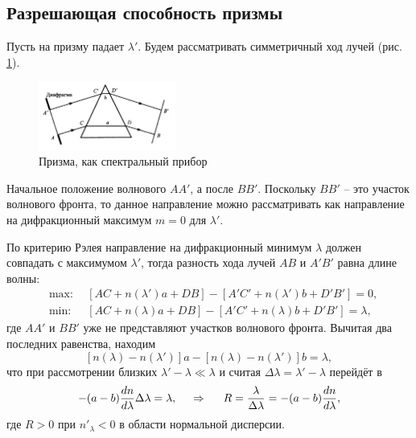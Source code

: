 \subsection{Разрешающая способность призмы}

Пусть на призму падает $\lambda'$. Будем рассматривать симметричный ход лучей (рис. \ref{fig:pr}). 
\begin{figure}[h]
    \centering
    \includegraphics[width=0.4\textwidth]{figures/49_1.png}
    \caption{Призма, как спектральный прибор}
    \label{fig:pr}
\end{figure}
Начальное положение волнового $AA'$, а после $BB'$. Поскольку $BB'$ -- это участок волнового фронта, то данное направление можно рассматривать как направление на дифракционный максимум $m=0$ для $\lambda'$. 

По критерию Рэлея направление на дифракционный минимум $\lambda$ должен совпадать с максимумом $\lambda'$, тогда разность хода лучей $AB$ и $A' B'$ равна длине волны:
\begin{align*}
    &\text{max:} \ \ 
    &\left[AC + n(\lambda') a + DB\right] - \left[
        A'C' + n(\lambda') b + D' B'
    \right] = 0, \\
    &\text{min:} \ \ 
    &\left[AC + n(\lambda) a + DB\right] - 
    \left[
        A'C' + n(\lambda) b + D' B'
    \right] = \lambda,
\end{align*}
где $AA'$ и $BB'$ уже не представляют участков волнового фронта.  Вычитая два последних равенства, находим
\begin{equation*}
    \left[n(\lambda)-n(\lambda')\right]a - \left[n(\lambda)-n(\lambda')\right]b = \lambda,
\end{equation*}
что при рассмотрении близких $\lambda' - \lambda \ll\lambda$ и считая $\Delta \lambda = \lambda'-\lambda$ перейдёт в 
\begin{equation*}
    -(a-b) \frac{d n}{d \lambda} \Delta \lambda = \lambda,
    \hspace{0.5cm} \Rightarrow \hspace{0.5cm}
    R = \frac{\lambda}{\Delta \lambda} = - (a-b) \frac{d n}{d \lambda},
\end{equation*}
где $R > 0$ при $n'_\lambda < 0$ в области нормальной дисперсии.